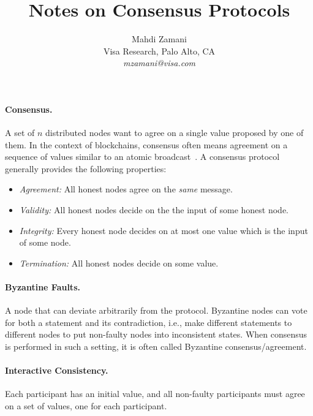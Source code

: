 \documentclass[11pt]{article}
\theoremstyle{mytheoremstyle}
\begin{document}
\title{Notes on Consensus Protocols}

\author{Mahdi Zamani\\ Visa Research, Palo Alto, CA \\ \textit{mzamani@visa.com}}
\date{}

\maketitle

\paragraph{Consensus.}
A set of $n$ distributed nodes want to agree on a single value proposed by one of them. In the context of blockchains, consensus often means agreement on a sequence of values similar to an atomic broadcast~\cite{DBLP:journals/corr/CachinV17}. A consensus protocol generally provides the following properties:

\begin{itemize}
	\item \textit{Agreement:} All honest nodes agree on the \emph{same} message.
	\item \textit{Validity:} All honest nodes decide on the the input of some honest node.
	\item \textit{Integrity:} Every honest node decides on at most one value which is the input of some node.
	\item \textit{Termination:} All honest nodes decide on some value.
\end{itemize}

\paragraph{Byzantine Faults.} A node that can deviate arbitrarily from the protocol. Byzantine nodes can vote for both a statement and its contradiction, i.e., make different statements to different nodes to put non-faulty nodes into inconsistent states. When consensus is performed in such a setting, it is often called Byzantine consensus/agreement.

\paragraph{Interactive Consistency.} Each participant has an initial value, and all non-faulty participants must agree on a set of values, one for each participant.
\end{document}
